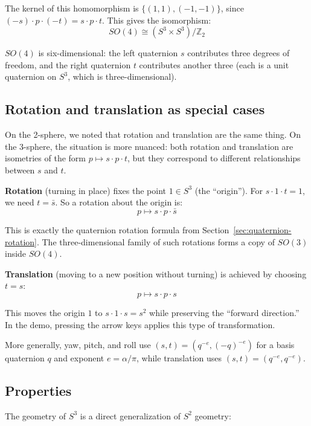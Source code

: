 \documentclass[twocolumn,10pt]{article}
\begin{document}
The kernel of this homomorphism is $\{(1, 1), (-1, -1)\}$, since $(-s) \cdot p \cdot (-t) = s \cdot p \cdot t$. This gives the isomorphism:
\[
    SO(4) \cong (S^3 \times S^3) / \mathbb{Z}_2
\]

$SO(4)$ is six-dimensional: the left quaternion $s$ contributes three degrees of freedom, and the right quaternion $t$ contributes another three (each is a unit quaternion on $S^3$, which is three-dimensional).

\subsection{Rotation and translation as special cases}

On the 2-sphere, we noted that rotation and translation are the same thing. On the 3-sphere, the situation is more nuanced: both rotation and translation are isometries of the form $p \mapsto s \cdot p \cdot t$, but they correspond to different relationships between $s$ and $t$.

\textbf{Rotation} (turning in place) fixes the point $1 \in S^3$ (the ``origin''). For $s \cdot 1 \cdot t = 1$, we need $t = \bar{s}$. So a rotation about the origin is:
\[
    p \mapsto s \cdot p \cdot \bar{s}
\]

This is exactly the quaternion rotation formula from Section~\ref{sec:quaternion-rotation}. The three-dimensional family of such rotations forms a copy of $SO(3)$ inside $SO(4)$.

\textbf{Translation} (moving to a new position without turning) is achieved by choosing $t = s$:
\[
    p \mapsto s \cdot p \cdot s
\]

This moves the origin $1$ to $s \cdot 1 \cdot s = s^2$ while preserving the ``forward direction.'' In the demo, pressing the arrow keys applies this type of transformation.

More generally, yaw, pitch, and roll use $(s, t) = (q^{-e}, (-q)^{-e})$ for a basis quaternion $q$ and exponent $e = \alpha/\pi$, while translation uses $(s, t) = (q^{-e}, q^{-e})$.

\subsection{Properties}

The geometry of $S^3$ is a direct generalization of $S^2$ geometry:
\end{document}
